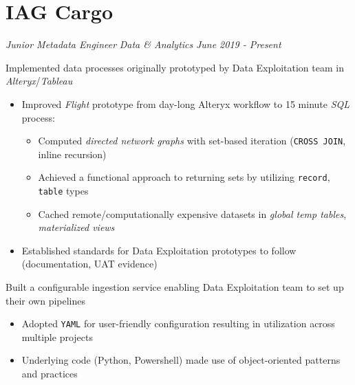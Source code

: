 \documentclass[../cv.tex]{subfiles}
\begin{document}
\section{IAG Cargo}
\textit{Junior Metadata Engineer}
\hfill
\textit{Data \& Analytics}
\hfill
\textit{June 2019 - Present}
\begin{description}[style=multiline, leftmargin=3.5cm]
	\item[Prototype Implementation\\\textnormal{PL/SQL}] Implemented data processes originally prototyped by Data Exploitation team in \textit{Alteryx}/\textit{Tableau}
	      \begin{itemize}
		      \item Improved \textit{Flight} prototype from day-long Alteryx workflow to 15 minute \textit{SQL} process:
		            \begin{itemize}
			            \item Computed \textit{directed network graphs} with set-based iteration (\texttt{CROSS JOIN}, inline recursion)
			            \item Achieved a functional approach to returning sets by utilizing \texttt{record}, \texttt{table} types
			            \item Cached remote/computationally expensive datasets in \textit{global temp tables}, \textit{materialized views}
					\end{itemize}
		      \item Established standards for Data Exploitation prototypes to follow (documentation, UAT evidence)
	      \end{itemize}
	\item[Self-Service Pipeline Automation\\\textnormal{Python\\Powershell\\YAML}]
	      Built a configurable ingestion service enabling Data Exploitation team to set up their own pipelines
	      \begin{itemize}
			\item Adopted \texttt{YAML} for user-friendly configuration resulting in utilization across multiple projects
			  \item Underlying code (Python, Powershell) made use of object-oriented patterns and practices

\end{itemize}
\end{description}
\end{document}
